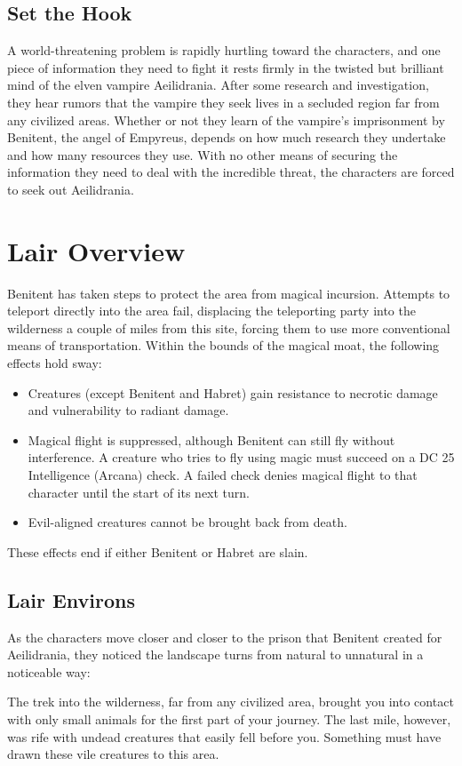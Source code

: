 \documentclass[10pt,a4paper,twoside,twocolumn,openany,bg=print,nodeprecatedcode]{dndbook}
\begin{document}
\subsection{Set the Hook}
A world-threatening problem is rapidly hurtling toward the characters, and one piece of information they need to fight it rests firmly in the twisted but brilliant mind of the elven vampire Aeilidrania. After some research and investigation, they hear rumors that the vampire they seek lives in a secluded region far from any civilized areas. Whether or not they learn of the vampire's imprisonment by Benitent, the angel of Empyreus, depends on how much research they undertake and how many resources they use. With no other means of securing the information they need to deal with the incredible threat, the characters are forced to seek out Aeilidrania.
\section{Lair Overview}
Benitent has taken steps to protect the area from magical incursion. Attempts to teleport directly into the area fail, displacing the teleporting party into the wilderness a couple of miles from this site, forcing them to use more conventional means of transportation. Within the bounds of the magical moat, the following effects hold sway:

\begin{itemize}
\item Creatures (except Benitent and Habret) gain resistance to necrotic damage and vulnerability to radiant damage.
\item Magical flight is suppressed, although Benitent can still fly without interference. A creature who tries to fly using magic must succeed on a DC 25 Intelligence (Arcana) check. A failed check denies magical flight to that character until the start of its next turn.
\item Evil-aligned creatures cannot be brought back from death.
\end{itemize}

These effects end if either Benitent or Habret are slain.
\subsection{Lair Environs}
As the characters move closer and closer to the prison that Benitent created for Aeilidrania, they noticed the landscape turns from natural to unnatural in a noticeable way:
\begin{DndReadAloud}{}
The trek into the wilderness, far from any civilized area, brought you into contact with only small animals for the first part of your journey. The last mile, however, was rife with undead creatures that easily fell before you. Something must have drawn these vile creatures to this area.
\end{DndReadAloud}
\end{document}
